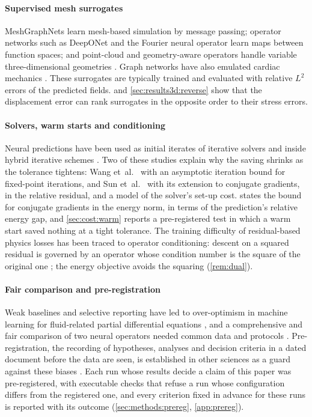 \paragraph{Supervised mesh surrogates}
MeshGraphNets \cite{Pfaff2021} learn mesh-based simulation by message passing; operator
networks such as DeepONet \cite{Lu2021DeepONet} and the Fourier neural operator
\cite{Li2021FNO} learn maps between function spaces; and point-cloud and
geometry-aware operators handle variable three-dimensional geometries
\cite{He2024GeomDeepONet,Zeng2025PCNO,Liu2026GINOT}. Graph networks have also emulated
cardiac mechanics \cite{Dalton2022}. These surrogates are typically trained and evaluated
with relative $L^2$ errors of the predicted fields.  and
\cref{sec:results3d:reverse} show that the displacement error can rank surrogates in the
opposite order to their stress errors.

\paragraph{Solvers, warm starts and conditioning}
Neural predictions have been used as initial iterates of iterative solvers
\cite{Wang2026PretrainFEM,Eshaghi2026NOWS,Sun2026FEVessel} and inside hybrid iterative
schemes \cite{Lee2025MetaSolver}. Two of these studies explain why the saving shrinks as the
tolerance tightens: Wang et~al.~\cite{Wang2026PretrainFEM} with an asymptotic iteration
bound for fixed-point iterations, and Sun et~al.~\cite{Sun2026FEVessel} with its extension
to conjugate gradients, in the relative residual, and a model of the solver's set-up cost.
 states the bound for conjugate gradients in the energy norm, in terms of the
prediction's relative energy gap, and \cref{sec:cost:warm} reports a pre-registered test in
which a warm start saved nothing at a tight tolerance.
The training difficulty of residual-based physics losses has been traced to operator
conditioning: descent on a squared residual is governed by an operator whose condition
number is the square of the original one \cite{DeRyck2024}; the energy objective avoids
the squaring (\cref{rem:dual}).

\paragraph{Fair comparison and pre-registration}
Weak baselines and selective reporting have led to over-optimism in machine learning for
fluid-related partial differential equations \cite{McGreivy2024}, and a comprehensive and
fair comparison of two neural operators needed common data and protocols
\cite{Lu2022Fair}. Pre-registration, the recording of hypotheses, analyses and decision
criteria in a dated document before the data are seen, is established in other sciences as
a guard against these biases \cite{Nosek2018}. Each run whose results decide a claim of
this paper was pre-registered, with executable checks that refuse a run whose configuration
differs from the registered one, and every criterion fixed in advance for these runs is
reported with its outcome (\cref{sec:methods:prereg}, \ref{app:prereg}).
